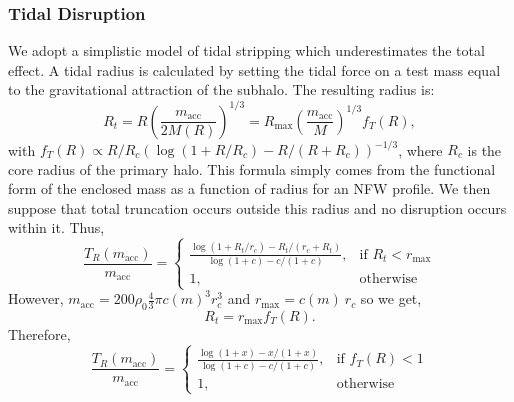 \documentclass[usenatbib]{mnras}
\begin{document}
\subsubsection{Tidal Disruption} 
We adopt a simplistic model of tidal stripping which underestimates the total effect. A tidal radius is calculated by setting the tidal force on a test mass equal to the gravitational attraction of the subhalo. The resulting radius is:
\begin{equation}
R_t = R \left(\frac{m_{\text{acc}}}{2 M(R)}\right)^{1/3} =  R_{\text{max}} \left(\frac{m_{\text{acc}}}{M}\right)^{1/3} f_T(R), 
\end{equation} 
with $f_T(R) \propto R/R_c(\log(1+R/R_c) - R/(R+R_c))^{-1/3}$, where $R_c$ is the core radius of the primary halo. This formula simply comes from the functional form of the enclosed mass as a function of radius for an NFW profile. We then suppose that total truncation occurs outside this radius and no disruption occurs within it. Thus,
\begin{equation}
\frac{T_R(m_{\text{acc}})}{m_{\text{acc}}} = 
\begin{cases}
\frac{\log{(1+R_t/r_c)} - R_t/(r_c+R_t)}{\log{(1+c)} - c/(1+c)},
& \text{if } R_t < r_{\text{max}}
\\
    1,              & \text{otherwise}
\end{cases}
\end{equation} 
However, $m_{\text{acc}} = 200 \rho_0 \frac{4}{3} \pi c(m)^3 r_c^3$ and $r_{\text{max}} = c(m) \: r_{c}$ so we get,
\begin{equation}
R_t = r_{\text{max}} f_T(R).
\end{equation}
Therefore,
\begin{equation} \label{trunc}
\frac{T_R(m_{\text{acc}})}{m_{\text{acc}}} =
\begin{cases}
\frac{\log{(1 + x)} - x/(1 + x)}{\log{(1+c)} - c/(1+c)},& \text{if } f_T(R) < 1
\\
1, & \text{otherwise}
\end{cases}
\end{equation} 
\end{document}
